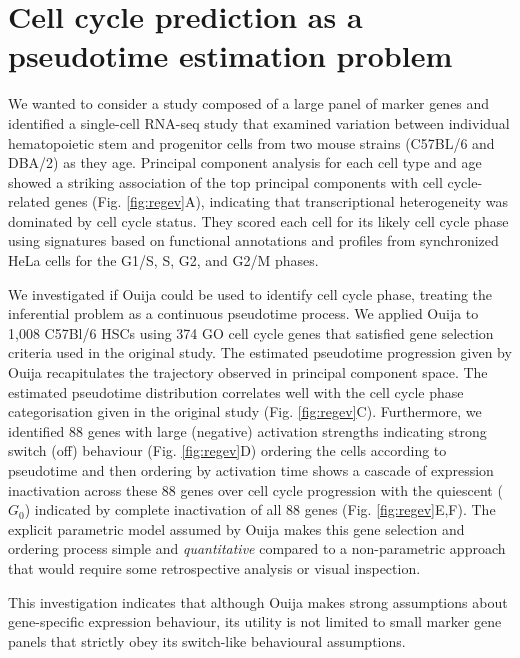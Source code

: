 \section{Cell cycle prediction as a pseudotime estimation problem}

We wanted to consider a study composed of a large panel of marker genes and identified a single-cell RNA-seq study \cite{kowalczyk2015single} that examined variation between individual hematopoietic stem and progenitor cells from two mouse strains (C57BL/6 and DBA/2) as they age. Principal component analysis for each cell type and age showed a striking association of the top principal components with cell cycle-related genes (Fig. \ref{fig:regev}A), indicating that transcriptional heterogeneity was dominated by cell cycle status. They scored each cell for its likely cell cycle phase using signatures based on functional annotations \cite{reference2009gene} and profiles from synchronized HeLa cells\cite{whitfield2002identification} for the G1/S, S, G2, and G2/M phases.

We investigated if Ouija could be used to identify cell cycle phase, treating the inferential problem as a continuous pseudotime process. We applied Ouija to 1,008 C57Bl/6 HSCs using 374 GO cell cycle genes that satisfied gene selection criteria used in the original study. The estimated pseudotime progression given by Ouija recapitulates the  trajectory observed in principal component space. The estimated pseudotime distribution correlates well with the cell cycle phase categorisation  given in the original study (Fig. \ref{fig:regev}C). Furthermore, we identified 88 genes with large (negative) activation strengths indicating strong switch (off) behaviour (Fig. \ref{fig:regev}D) ordering the cells according to pseudotime and then ordering by activation time shows a cascade of expression inactivation across these 88 genes over cell cycle progression with the quiescent ($G_0$) indicated by complete inactivation of all 88 genes (Fig. \ref{fig:regev}E,F). The explicit parametric model assumed by Ouija makes this gene selection and ordering process simple and \emph{quantitative} compared to a non-parametric approach that would require some retrospective analysis or visual inspection.

This investigation indicates that although Ouija makes strong assumptions about gene-specific expression behaviour, its utility is not limited to small marker gene panels that strictly obey its switch-like behavioural assumptions.

